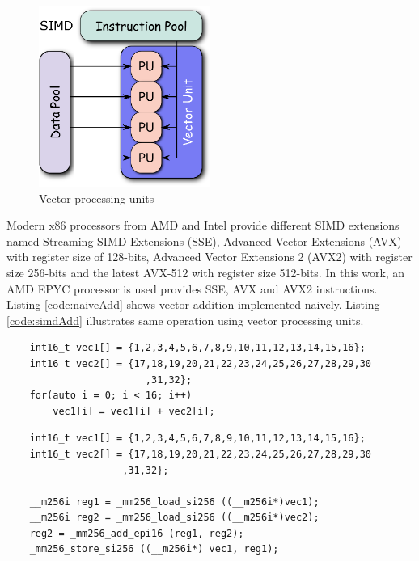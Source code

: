 \begin{figure}[h]
	\centering
	\includegraphics[width=0.5\textwidth]{./figures/SIMD2.eps}
	\caption{Vector processing units \cite{SIMDWiki}}
	\label{fig:simdUnits}
\end{figure}

Modern x86 processors from AMD and Intel provide different SIMD extensions named Streaming SIMD Extensions (SSE), Advanced Vector Extensions (AVX) with register size of 128-bits, Advanced Vector Extensions 2 (AVX2) with register size 256-bits and the latest AVX-512 with register size 512-bits. In this work, an AMD EPYC processor is used provides SSE, AVX and AVX2 instructions. Listing \ref{code:naiveAdd} shows vector addition implemented naively. Listing \ref{code:simdAdd} illustrates same operation using vector processing units. 

\begin{code}
	\label{code:naiveAdd}
	\begin{verbatim}
	int16_t vec1[] = {1,2,3,4,5,6,7,8,9,10,11,12,13,14,15,16};
	int16_t vec2[] = {17,18,19,20,21,22,23,24,25,26,27,28,29,30
						,31,32};
	for(auto i = 0; i < 16; i++)
		vec1[i] = vec1[i] + vec2[i];
	\end{verbatim}
\end{code}

\begin{code}
	\label{code:simdAdd}
	\begin{verbatim}
	int16_t vec1[] = {1,2,3,4,5,6,7,8,9,10,11,12,13,14,15,16};
	int16_t vec2[] = {17,18,19,20,21,22,23,24,25,26,27,28,29,30
					,31,32};
	
	__m256i reg1 = _mm256_load_si256 ((__m256i*)vec1);
	__m256i reg2 = _mm256_load_si256 ((__m256i*)vec2);
	reg2 = _mm256_add_epi16 (reg1, reg2);
	_mm256_store_si256 ((__m256i*) vec1, reg1);
	
	\end{verbatim}
\end{code}


